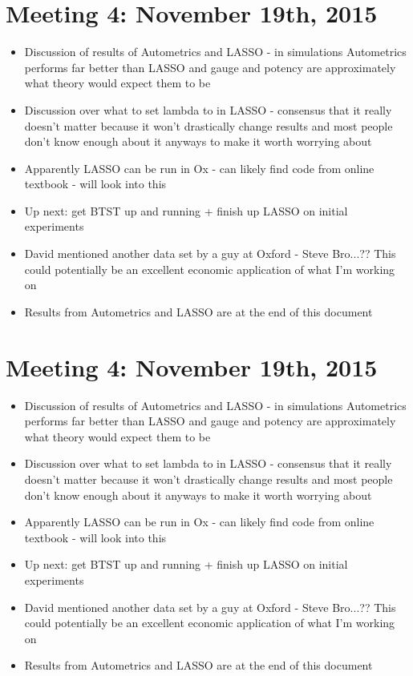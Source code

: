 \documentclass[11pt, oneside]{book}   	%
\begin{document}
\section{Meeting 4: November 19th, 2015}
\begin{itemize}
\item Discussion of results of Autometrics and LASSO - in simulations Autometrics performs far better than LASSO and gauge and potency are approximately  what theory would expect them to be
\item Discussion over what to set lambda to in LASSO - consensus that it really doesn't matter because it won't drastically change results and most people don't know enough about it anyways to make it worth worrying about
\item Apparently LASSO can be run in Ox - can likely find code from online textbook - will look into this
\item Up next: get BTST up and running + finish up LASSO on initial experiments
\item David mentioned another data set by a guy at Oxford - Steve Bro...?? This could potentially be an excellent economic application of what I'm working on 
\item Results from Autometrics and LASSO are at the end of this document
\end {itemize}


\section{Meeting 4: November 19th, 2015}
\begin{itemize}
\item Discussion of results of Autometrics and LASSO - in simulations Autometrics performs far better than LASSO and gauge and potency are approximately  what theory would expect them to be
\item Discussion over what to set lambda to in LASSO - consensus that it really doesn't matter because it won't drastically change results and most people don't know enough about it anyways to make it worth worrying about
\item Apparently LASSO can be run in Ox - can likely find code from online textbook - will look into this
\item Up next: get BTST up and running + finish up LASSO on initial experiments
\item David mentioned another data set by a guy at Oxford - Steve Bro...?? This could potentially be an excellent economic application of what I'm working on 
\item Results from Autometrics and LASSO are at the end of this document
\end {itemize}
\end{document}
